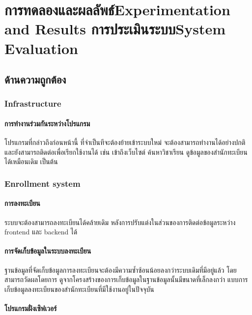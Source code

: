 \chapter{\ifproject%
\ifcpe การทดลองและผลลัพธ์\else Experimentation and Results\fi
\else%
\ifcpe การประเมินระบบ\else System Evaluation\fi
\fi}

\section{ด้านความถูกต้อง}

\subsection{Infrastructure}

\subsubsection{การทำงานร่วมกันระหว่างโปรแกรม}

โปรแกรมที่กล่าวถึงก่อนหน้านี้ ที่จำเป็นทีจะต้องย้ายเข้าระบบใหม่ จะต้องสามารถทำงานได้อย่างปกติ และยังสามารถติดต่อเพื่อเรียกใช้งานได้ เช่น เข้าถึงเว็บไซต์ ค้นหาวิชาเรียน ดูข้อมูลของสำนักทะเบียนได้เหมือนเดิม เป็นต้น

\subsection{Enrollment system}

\subsubsection{การลงทะเบียน}

ระบบจะต้องสามารถลงทะเบียนได้คล้ายเดิม หลังการปรับแต่งในส่วนของการติดต่อข้อมูลระหว่าง frontend และ backend ได้

\subsubsection{การจัดเก็บข้อมูลในระบบลงทะเบียน}

ฐานข้อมูลที่จัดเก็บข้อมูลการลงทะเบียนจะต้องมีความซ้ำซ้อนน้อยลงกว่าระบบเดิมที่มีอยู่แล้ว โดยสามารถวัดผลโดยการ ดูจากโครงสร้างของการเก็บข้อมูลในฐานข้อมูลนั้นมีขนาดที่เล็กลงกว่า แบบการเก็บข้อมูลลงทะเบียนของสำนักทะเบียนที่มีใช้งานอยู่ในปัจจุบัน

\subsubsection{โปรแกรมฝั่งเซิฟเวอร์}


